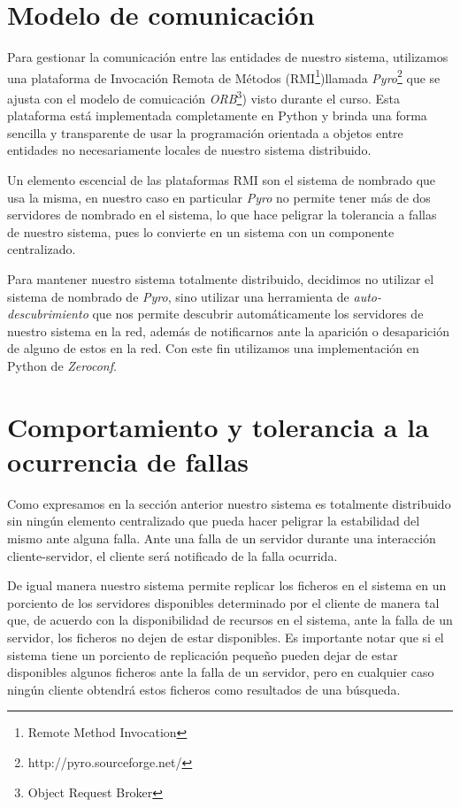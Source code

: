 \documentclass{article}
\begin{document}
\section{Modelo de comunicación}

Para gestionar la comunicación entre las entidades de nuestro sistema,
utilizamos una plataforma de Invocación Remota de Métodos (RMI\footnote{Remote
Method  Invocation})llamada \emph{Pyro}\footnote{http://pyro.sourceforge.net/}
que se ajusta con el modelo de comuicación \emph{ORB}\footnote{Object Request
Broker}) visto durante el curso. Esta plataforma está implementada
completamente en Python y brinda una forma sencilla y transparente de usar la
programación orientada a objetos entre entidades no necesariamente locales de
nuestro sistema distribuido.

Un elemento escencial de las plataformas RMI son el sistema de nombrado que usa
la misma, en nuestro caso en particular \emph{Pyro} no permite tener más de dos
servidores de nombrado en el sistema, lo que hace peligrar la tolerancia a
fallas de nuestro sistema, pues lo convierte en un sistema con un componente
centralizado. 

Para mantener nuestro sistema totalmente distribuido, decidimos
no utilizar el sistema de nombrado de \emph{Pyro}, sino utilizar una
herramienta de \emph{auto-descubrimiento} que nos permite descubrir
automáticamente los servidores de nuestro sistema en la red, además de
notificarnos ante la aparición o desaparición de alguno de estos en la red. Con
este fin utilizamos una implementación en Python de \emph{Zeroconf}.

\section{Comportamiento y tolerancia a la ocurrencia de fallas}

Como expresamos en la sección anterior nuestro sistema es totalmente
distribuido sin ningún elemento centralizado que pueda hacer peligrar la
estabilidad del mismo ante alguna falla. Ante una falla de un servidor durante
una interacción cliente-servidor, el cliente será notificado de la falla
ocurrida.

De igual manera nuestro sistema permite replicar los ficheros en el sistema en
un porciento de los servidores disponibles determinado por el cliente de
manera tal que, de acuerdo con la disponibilidad de recursos en el sistema,
ante la falla de un servidor, los ficheros no dejen de estar disponibles. Es
importante notar que si el sistema tiene un porciento de replicación pequeño
pueden dejar de estar disponibles algunos ficheros ante la falla de un
servidor, pero en cualquier caso ningún cliente obtendrá estos ficheros como
resultados de una búsqueda.
\end{document}
